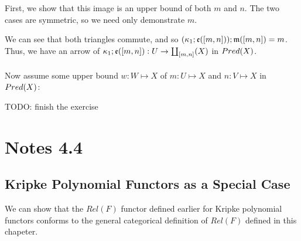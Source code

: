 \documentclass{article}
\begin{document}
First, we show that this image is an upper bound of both $m$ and $n$. The two cases are symmetric, so we need only 
demonstrate $m$.

\begin{center}
\end{center}

We can see that both triangles commute, and so $(\kappa_1;\frak e([m,n]));\frak m([m,n]) = m$. Thus, we have an arrow
of $\kappa_1;\frak e([m,n]) : U \to \coprod_{[m,n]}(X)$ in $\mit{Pred}(X)$.\\~\\
Now assume some upper bound $w : W \mapsto X$ of $m : U \mapsto X$ and $n : V \mapsto X$ in $\mit{Pred}(X)$:

TODO: finish the exercise

\section*{Notes 4.4}

\subsection*{Kripke Polynomial Functors as a Special Case}

We can show that the $\mathit{Rel}(F)$ functor defined earlier for 
Kripke polynomial functors conforms to the general categorical
definition of $\mathit{Rel}(F)$ defined in this chapeter.
\end{document}
